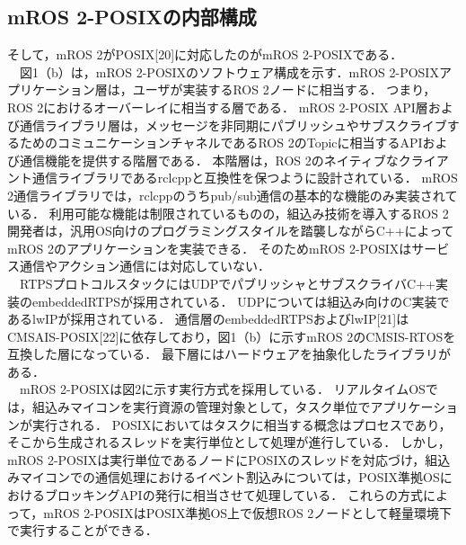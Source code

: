 \subsection{mROS 2-POSIXの内部構成}
そして，mROS 2がPOSIX[20]に対応したのがmROS 2-POSIXである．
\\　図1（b）は，mROS 2-POSIXのソフトウェア構成を示す．mROS 2-POSIXアプリケーション層は，ユーザが実装するROS 2ノードに相当する．
つまり，ROS 2におけるオーバーレイに相当する層である．
mROS 2-POSIX API層および通信ライブラリ層は，メッセージを非同期にパブリッシュやサブスクライブするためのコミュニケーションチャネルであるROS 2のTopicに相当するAPIおよび通信機能を提供する階層である．
本階層は，ROS 2のネイティブなクライアント通信ライブラリであるrclcppと互換性を保つように設計されている．
mROS 2通信ライブラリでは，rclcppのうちpub/sub通信の基本的な機能のみ実装されている．
利用可能な機能は制限されているものの，組込み技術を導入するROS 2開発者は，汎用OS向けのプログラミングスタイルを踏襲しながらC++によってmROS 2のアプリケーションを実装できる．
そのためmROS 2-POSIXはサービス通信やアクション通信には対応していない．
\\　RTPSプロトコルスタックにはUDPでパブリッシャとサブスクライバC++実装のembeddedRTPSが採用されている．
UDPについては組込み向けのC実装であるlwIPが採用されている．
通信層のembeddedRTPSおよびlwIP[21]はCMSAIS-POSIX[22]に依存しており，図1（b）に示すmROS 2のCMSIS-RTOSを互換した層になっている．
最下層にはハードウェアを抽象化したライブラリがある．
\\　mROS 2-POSIXは図2に示す実行方式を採用している．
リアルタイムOSでは，組込みマイコンを実行資源の管理対象として，タスク単位でアプリケーションが実行される．
POSIXにおいてはタスクに相当する概念はプロセスであり，そこから生成されるスレッドを実行単位として処理が進行している．
しかし，mROS 2-POSIXは実行単位であるノードにPOSIXのスレッドを対応づけ，組込みマイコンでの通信処理におけるイベント割込みについては，POSIX準拠OSにおけるブロッキングAPIの発行に相当させて処理している．
これらの方式によって，mROS 2-POSIXはPOSIX準拠OS上で仮想ROS 2ノードとして軽量環境下で実行することができる．

